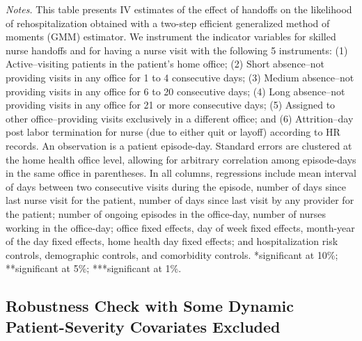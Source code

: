 \documentclass[final,12pt, notitlepage]{article}
\begin{document}
\begin{singlespace}
\begin{table}[H]
\begin{threeparttable}
{}
	\begin{tablenotes}
	\scriptsize
		\item \emph{Notes.} This table presents IV estimates of the effect of handoffs on the likelihood of rehospitalization obtained with a two-step efficient generalized method of moments (GMM) estimator.
	We instrument the indicator variables for skilled nurse handoffs and for having a nurse visit with the following 5 instruments:
(1) Active--visiting patients in the patient's home office;
(2) Short absence--not providing visits in any office for 1 to 4 consecutive days;
(3) Medium absence--not providing visits in any office for 6 to 20 consecutive days;
(4) Long absence--not providing visits in any office for 21 or more consecutive days;
(5) Assigned to other office--providing visits exclusively in a different office; and
(6) Attrition--day post labor termination for nurse (due to either quit or layoff) according to HR records.
	An observation is a patient episode-day.
	Standard errors are clustered at the home health office level, allowing for arbitrary correlation among episode-days in the same office in parentheses.
	In all columns, regressions include mean interval of days between two consecutive visits during the episode, number of days since last nurse visit for the patient, number of days since last visit by any provider for the patient; number of ongoing episodes in the office-day, number of nurses working in the office-day; office fixed effects, day of week fixed effects, month-year of the day fixed effects, home health day fixed effects; and hospitalization risk controls, demographic controls, and comorbidity controls.
	*significant at 10\%; **significant at 5\%; ***significant at 1\%.

	\end{tablenotes}
\end{threeparttable}
\end{table}


\subsection{Robustness Check with Some Dynamic Patient-Severity Covariates Excluded} \label{appendix:iv_noendog}


\end{singlespace}
\end{document}
